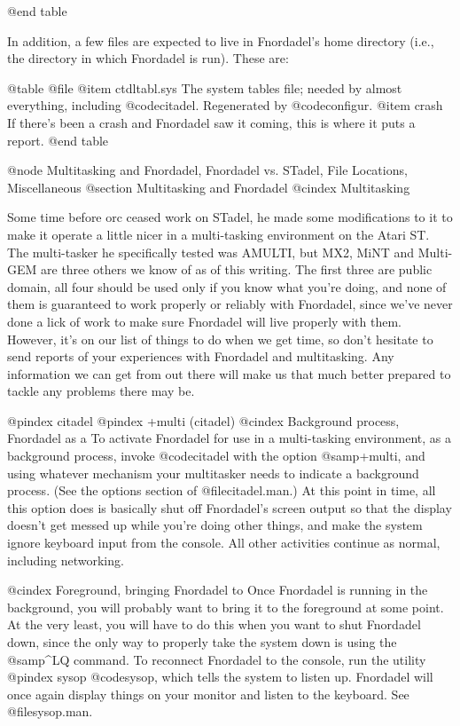 {{{@end table

In addition, a few files are expected to live in Fnordadel's home
directory (i.e., the directory in which Fnordadel is run).  These are:

@table @file
@item ctdltabl.sys
The system tables file; needed by almost everything,
including @code{citadel}.  Regenerated by @code{configur}.
@item crash
If there's been a crash and Fnordadel saw it coming,
this is where it puts a report.
@end table

@node Multitasking and Fnordadel, Fnordadel vs. STadel, File Locations, Miscellaneous
@section Multitasking and Fnordadel
@cindex Multitasking

Some time before orc ceased work on STadel, he made some modifications
to it to make it operate a little nicer in a multi-tasking environment on the
Atari ST.  The multi-tasker he specifically tested was AMULTI, but MX2, MiNT
and Multi-GEM are three others we know of as of this writing.  The first three
are public domain,
all four should be used only if you know what you're doing, and none of them
is guaranteed to work properly or reliably with Fnordadel, since we've
never done a lick of work to make sure Fnordadel will live properly with
them.  However, it's on our list of things to do when we get time, so don't
hesitate to send reports of your experiences with Fnordadel and
multitasking.  Any information we can get from out there will make us that much
better prepared to tackle any problems there may be.

@pindex citadel
@pindex +multi (citadel)
@cindex Background process, Fnordadel as a
To activate Fnordadel for use in a multi-tasking environment, as a background
process, invoke @code{citadel} with the option @samp{+multi}, and using
whatever mechanism your multitasker needs to indicate a background process.
(See the options section of @file{citadel.man}.)  At this point in time, all
this option does is basically shut off Fnordadel's screen output so that the
display doesn't get messed up while you're doing other things, and make the
system ignore keyboard input from the console.  All other activities continue
as normal, including networking.

@cindex Foreground, bringing Fnordadel to
Once Fnordadel is running in the background, you will probably want to
bring it to the foreground at some point.  At the very least, you will
have to do this when you want to shut Fnordadel down, since the only way
to properly take the system down is using the @samp{^LQ} command.  To
reconnect Fnordadel to the console, run the utility
@pindex sysop
@code{sysop}, which tells the system to listen up.  Fnordadel
will once again display things on your monitor and listen to the keyboard.
See @file{sysop.man}.

}}}
